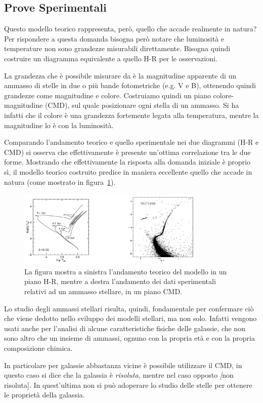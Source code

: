 \subsection{Prove Sperimentali}

Questo modello teorico rappresenta, però, quello che accade realmente in natura? Per rispondere a questa domanda bisogna però notare che luminosità e temperature non sono grandezze misurabili direttamente. Bisogna quindi costruire un diagramma equivalente a quello H-R per le osservazioni.

La grandezza che è possibile misurare da è la magnitudine apparente di un ammasso di stelle in due o più bande fotometriche (e.g. V e B), ottenendo quindi grandezze come magnitudine e colore. Costruiamo quindi un piano colore-magnitudine (CMD), sul quale posizionare ogni stella di un ammasso. Si ha infatti che il colore è una grandezza fortemente legata alla temperatura, mentre la magnitudine lo è con la luminosità.

Comparando l'andamento teorico e quello sperimentale nei due diagrammi (H-R e CMD) si osserva che effettivamente è presente un'ottima correlazione tra le due forme. Mostrando che effettivamente la risposta alla domanda iniziale è proprio sì, il modello teorico costruito predice in maniera eccellente quello che accade in natura (come mostrato in figura~\ref{fig:modello-osservazione-stellare}).
\begin{figure}
    \centering
    \includegraphics[width = 0.8\textwidth]{immagini/dati-sper-stelle.png}
    \caption{La figura mostra a sinistra l'andamento teorico del modello in un piano H-R, mentre a destra l'andamento dei dati sperimentali relativi ad un ammasso stellare, in un piano CMD.}\label{fig:modello-osservazione-stellare}
\end{figure}

Lo studio degli ammassi stellari risulta, quindi, fondamentale per confermare ciò che viene dedotto nello sviluppo dei modelli stellari, ma non solo. Infatti vengono usati anche per l'analisi di alcune caratteristiche fisiche delle galassie, che non sono altro che un insieme di ammassi, ognuno con la propria età e con la propria composizione chimica.

In particolare per galassie abbastanza vicine è possibile utilizzare il CMD, in questo caso si dice che la galassia è \textit{risoluta}, mentre nel caso opposto \textit[non risoluta]. In quest'ultima non si può adoperare lo studio delle stelle per ottenere le proprietà della galassia.